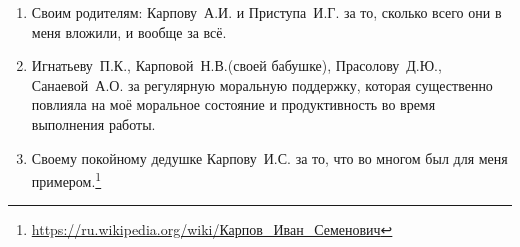 \begin{enumerate}
\item Своим родителям: Карпову~А.\:И. и Приступа~И.\:Г. за то, сколько всего они в меня вложили, и вообще за всё.
\item Игнатьеву~П.\:К., Карповой~Н.\:В.(своей бабушке), Прасолову~Д.\:Ю., Санаевой~А.\:О. за регулярную моральную поддержку, которая существенно повлияла на моё моральное состояние и продуктивность во время выполнения работы.
\item Своему покойному дедушке Карпову~И.\:С. за то, что во многом был для меня примером.\footnote{\url{https://ru.wikipedia.org/wiki/Карпов\_Иван\_Семенович}}
\end{enumerate}


